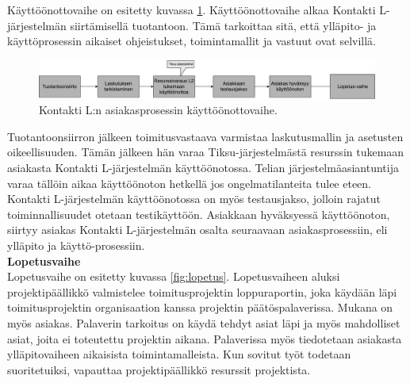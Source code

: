 \documentclass[finnish,12pt,a4paper,pdftex]{article}
\begin{document}

\noindent Käyttöönottovaihe on esitetty kuvassa \ref{fig:kayttoonotto}. Käyttöönottovaihe alkaa Kontakti L-järjestelmän siirtämisellä tuotantoon. Tämä tarkoittaa sitä, että ylläpito- ja käyttöprosessin aikaiset ohjeistukset, toimintamallit ja vastuut ovat selvillä. 

\begin{figure}[!h]
    \centering
    \includegraphics[scale=0.3]{images/kayttoonotto.pdf}
    \caption{Kontakti L:n asiakasprosessin käyttöönottovaihe.}
    \label{fig:kayttoonotto}
\end{figure}

\noindent Tuotantoonsiirron jälkeen toimitusvastaava varmistaa laskutusmallin ja asetusten oikeellisuuden. Tämän jälkeen hän varaa Tiksu-järjestelmästä resurssin tukemaan asiakasta Kontakti L-järjestelmän käyttöönotossa. Telian järjestelmäasiantuntija varaa tällöin aikaa käyttöönoton hetkellä jos ongelmatilanteita tulee eteen. Kontakti L-järjestelmän käyttöönotossa on myös testausjakso, jolloin rajatut toiminnallisuudet otetaan testikäyttöön. Asiakkaan hyväksyessä käyttöönoton, siirtyy asiakas Kontakti L-järjestelmän osalta seuraavaan asiakasprosessiin, eli ylläpito ja käyttö-prosessiin.\\


\textbf{Lopetusvaihe}\\

\noindent Lopetusvaihe on esitetty kuvassa  \ref{fig:lopetus}. Lopetusvaiheen aluksi projektipäällikkö valmistelee toimitusprojektin loppuraportin, joka käydään läpi toimitusprojektin organisaation kanssa projektin päätöspalaverissa. Mukana on myös asiakas. Palaverin tarkoitus on käydä tehdyt asiat läpi ja myös mahdolliset asiat, joita ei toteutettu projektin aikana. Palaverissa myös tiedotetaan asiakasta ylläpitovaiheen aikaisista toimintamalleista. Kun sovitut työt todetaan suoritetuiksi, vapauttaa projektipäällikkö resurssit projektista.\\
\end{document}
